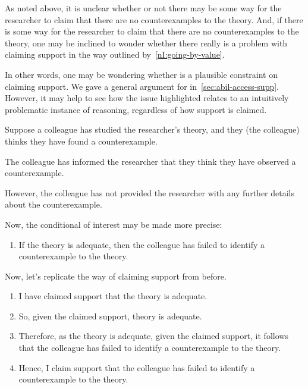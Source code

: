 \begin{note}
  As noted above, it is unclear whether or not there may be some way for the researcher to claim that there are no counterexamples to the theory.
  And, if there is some way for the researcher to claim that there are no counterexamples to the theory, one may be inclined to wonder whether there really is a problem with claiming support in the way outlined by~\ref{nI:going-by-value}.

  In other words, one may be wondering whether \eiS{} is a plausible constraint on claiming support.
  We gave a general argument for \eiS{} in~\autoref{sec:abil-access-supp}.
  However, it may help to see how the issue highlighted relates to an intuitively problematic instance of reasoning, regardless of how support is claimed.

  \begin{illustration}\label{ill:CE:colleague}
    Suppose a colleague has studied the researcher's theory, and they (the colleague) thinks they have found a counterexample.

    The colleague has informed the researcher that they think they have observed a counterexample.

    However, the colleague has not provided the researcher with any further details about the counterexample.

    Now, the conditional of interest may be made more precise:
    \begin{enumerate}
    \item If the theory is adequate, then the colleague has failed to identify a counterexample to the theory.
    \end{enumerate}

    Now, let's replicate the way of claiming support from before.

    \begin{enumerate}
    \item I have claimed support that the theory is adequate.
    \item So, given the claimed support, theory is adequate.
    \item Therefore, as the theory is adequate, given the claimed support, it follows that the colleague has failed to identify a counterexample to the theory.
    \item Hence, I claim support that the colleague has failed to identify a counterexample to the theory.
    \end{enumerate}
    \vspace{-\baselineskip}
  \end{illustration}


\end{note}
